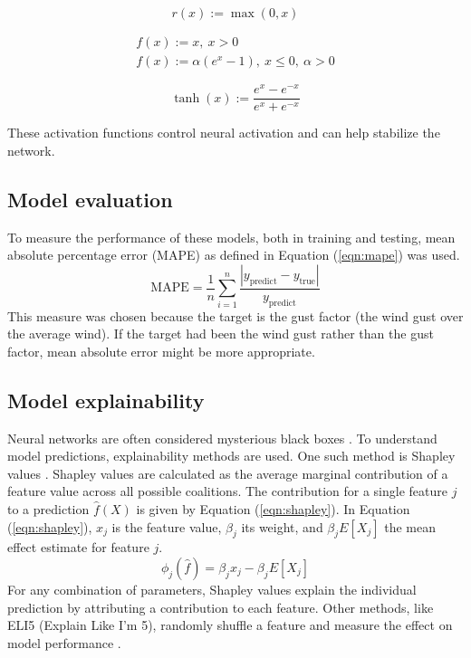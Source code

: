 \begin{equation}
    \label{eqn:relu}
    r(x):=\max(0, x)
\end{equation}

\begin{align}
    \label{eqn:elu}
    f(x) := x,\ x > 0\\
    f(x) := \alpha (e^x-1),\ x\leq 0,\ \alpha > 0
\end{align}

\begin{equation}
    \label{eqn:tanh}
    \operatorname{tanh}(x):=\frac{e^x-e^{-x}}{e^x+e^{-x}}
\end{equation}

These activation functions control neural activation and can help stabilize the network.
\subsection{Model evaluation}
To measure the performance of these models, both in training and testing, mean absolute percentage error (MAPE) as defined in Equation (\ref{eqn:mape}) was used.
\begin{equation}
    \label{eqn:mape}
    \text{MAPE} = \frac{1}{n}\sum_{i=1}^n\frac{|y_{\mathrm{predict}} - y_{\mathrm{true}}|}{y_{\mathrm{predict}}}
\end{equation}
This measure was chosen because the target is the gust factor (the wind gust over the average wind). If the target had been the wind gust rather than the gust factor, mean absolute error might be more appropriate.

\subsection{Model explainability}
Neural networks are often considered mysterious black boxes \cite{nn_black_box}. To understand model predictions, explainability methods are used. One such method is Shapley values \cite{shapley_information}. Shapley values are calculated as the average marginal contribution of a feature value across all possible coalitions. The contribution for a single feature \(j\) to a prediction \(\hat{f}(X)\) is given by Equation (\ref{eqn:shapley}). In Equation (\ref{eqn:shapley}), \(x_j\) is the feature value, \(\beta_j\) its weight, and \(\beta_j E[X_j]\) the mean effect estimate for feature \(j\).
\begin{equation}
    \label{eqn:shapley}
    \phi_j(\hat{f}) = \beta_j x_j - \beta_j E[X_j]
\end{equation}
For any combination of parameters, Shapley values explain the individual prediction by attributing a contribution to each feature. Other methods, like ELI5 (Explain Like I’m 5), randomly shuffle a feature and measure the effect on model performance \cite{eli5_information}.